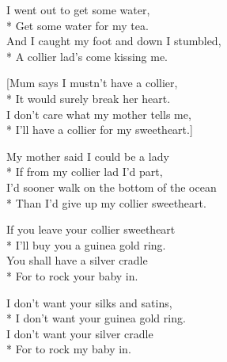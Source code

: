 
\versemark
I went out to get some water,\\*
Get some water for my tea.\\
And I caught my foot and down I stumbled,\\*
A collier lad’s come kissing me.


[Mum says I mustn’t have a collier,\\*
It would surely break her heart.\\
I don’t care what my mother tells me,\\*
I’ll have a collier for my sweetheart.]

\versemark
My mother said I could be a lady\\*
If from my collier lad I’d part,\\
I’d sooner walk on the bottom of the ocean\\*
Than I’d give up my collier sweetheart.

\versemark
If you leave your collier sweetheart\\*
I’ll buy you a guinea gold ring.\\
You shall have a silver cradle\\*
For to rock your baby in.

\versemark
I don’t want your silks and satins,\\*
I don’t want your guinea gold ring.\\
I don’t want your silver cradle\\*
For to rock my baby in.

